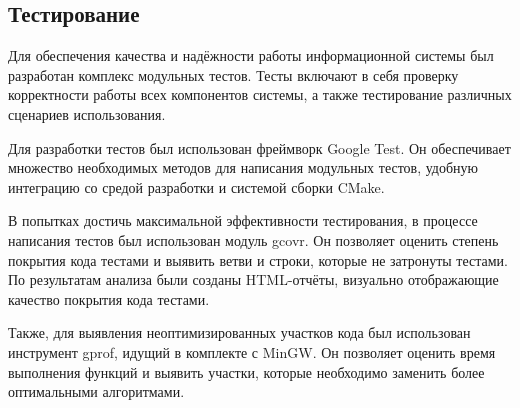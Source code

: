 \subsection{Тестирование}

Для обеспечения качества и надёжности работы информационной системы был разработан комплекс модульных тестов. Тесты включают в себя проверку корректности работы всех компонентов системы, а также тестирование различных сценариев использования.

Для разработки тестов был использован фреймворк Google Test. Он обеспечивает множество необходимых методов для написания модульных тестов, удобную интеграцию со средой разработки и системой сборки CMake.

В попытках достичь максимальной эффективности тестирования, в процессе написания тестов был использован модуль gcovr. Он позволяет оценить степень покрытия кода тестами и выявить ветви и строки, которые не затронуты тестами. По результатам анализа были созданы HTML-отчёты, визуально отображающие качество покрытия кода тестами.

Также, для выявления неоптимизированных участков кода был использован инструмент gprof, идущий в комплекте с MinGW. Он позволяет оценить время выполнения функций и выявить участки, которые необходимо заменить более оптимальными алгоритмами.
